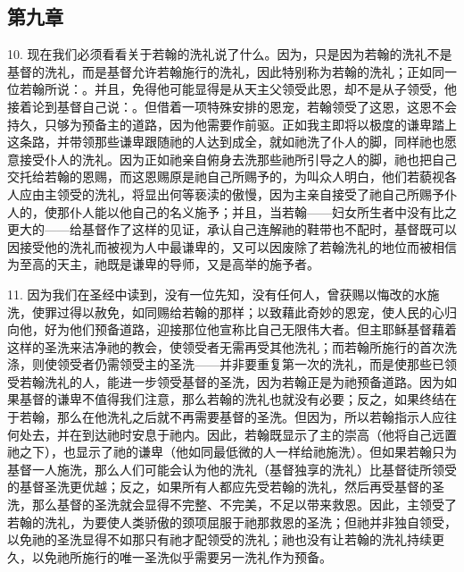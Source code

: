 
\subsection{第九章}

10. 现在我们必须看看关于若翰的洗礼说了什么。因为，只是因为若翰的洗礼不是基督的洗礼，而是基督允许若翰施行的洗礼，因此特别称为若翰的洗礼；正如同一位若翰所说：。并且，免得他可能显得是从天主父领受此恩，却不是从子领受，他接着论到基督自己说：。但借着一项特殊安排的恩宠，若翰领受了这恩，这恩不会持久，只够为预备主的道路，因为他需要作前驱。正如我主即将以极度的谦卑踏上这条路，并带领那些谦卑跟随祂的人达到成全，就如祂洗了仆人的脚，同样祂也愿意接受仆人的洗礼。因为正如祂亲自俯身去洗那些祂所引导之人的脚，祂也把自己交托给若翰的恩赐，而这恩赐原是祂自己所赐予的，为叫众人明白，他们若藐视各人应由主领受的洗礼，将显出何等亵渎的傲慢，因为主亲自接受了祂自己所赐予仆人的，使那仆人能以他自己的名义施予；并且，当若翰——妇女所生者中没有比之更大的——给基督作了这样的见证，承认自己连解祂的鞋带也不配时，基督既可以因接受他的洗礼而被视为人中最谦卑的，又可以因废除了若翰洗礼的地位而被相信为至高的天主，祂既是谦卑的导师，又是高举的施予者。\par

11. 因为我们在圣经中读到，没有一位先知，没有任何人，曾获赐以悔改的水施洗，使罪过得以赦免，如同赐给若翰的那样；以致藉此奇妙的恩宠，使人民的心归向他，好为他们预备道路，迎接那位他宣称比自己无限伟大者。但主耶稣基督藉着这样的圣洗来洁净祂的教会，使领受者无需再受其他洗礼；而若翰所施行的首次洗涤，则使领受者仍需领受主的圣洗——并非要重复第一次的洗礼，而是使那些已领受若翰洗礼的人，能进一步领受基督的圣洗，因为若翰正是为祂预备道路。因为如果基督的谦卑不值得我们注意，那么若翰的洗礼也就没有必要；反之，如果终结在于若翰，那么在他洗礼之后就不再需要基督的圣洗。但因为，所以若翰指示人应往何处去，并在到达祂时安息于祂内。因此，若翰既显示了主的崇高（他将自己远置祂之下），也显示了祂的谦卑（他如同最低微的人一样给祂施洗）。但如果若翰只为基督一人施洗，那么人们可能会认为他的洗礼（基督独享的洗礼）比基督徒所领受的基督圣洗更优越；反之，如果所有人都应先受若翰的洗礼，然后再受基督的圣洗，那么基督的圣洗就会显得不完整、不完美，不足以带来救恩。因此，主领受了若翰的洗礼，为要使人类骄傲的颈项屈服于祂那救恩的圣洗；但祂并非独自领受，以免祂的圣洗显得不如那只有祂才配领受的洗礼；祂也没有让若翰的洗礼持续更久，以免祂所施行的唯一圣洗似乎需要另一洗礼作为预备。\par


